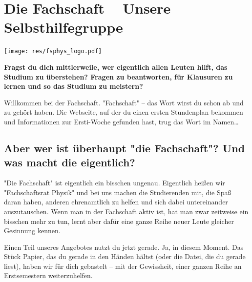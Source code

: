 \section[Die Fachschaft]{Die Fachschaft -- Unsere Selbsthilfegruppe}
\label{fsphys:sec}
\begin{center}
	\vspace{-0.5cm}
	\texttt{[image: res/fsphys\_logo.pdf]}
	\vspace{-0.5cm}
\end{center}
\begin{multicols}{2}
\fibelspacingsubsubsection[subsection]

\textbf{Fragst du dich mittlerweile, wer eigentlich allen Leuten hilft, das Studium zu überstehen? Fragen zu beantworten, für Klausuren zu lernen und so das Studium zu meistern?}

Willkommen bei der Fachschaft.
"Fachschaft" -- das Wort wirst du schon ab und zu gehört haben.
Die Webseite, auf der du einen ersten Stundenplan bekommen und Informationen zur Ersti-Woche gefunden hast, trug das Wort im Namen\dots

\subsection*{Aber wer ist überhaupt "die Fachschaft"? Und was macht die eigentlich?}
"Die Fachschaft" ist eigentlich ein bisschen ungenau.
Eigentlich heißen wir "Fachschaftsrat Physik" und bei uns machen die Studierenden mit, die Spaß daran haben, anderen ehrenamtlich zu helfen und sich dabei untereinander auszutauschen.
Wenn man in der Fachschaft aktiv ist, hat man zwar zeitweise ein bisschen mehr zu tun, lernt aber dafür eine ganze Reihe neuer Leute gleicher Gesinnung kennen.

Einen Teil unseres Angebotes nutzt du jetzt gerade.
Ja, in diesem Moment.
Das Stück Papier, das du gerade in den Händen hältst (oder die Datei, die du gerade liest), haben wir für dich gebastelt -- mit der Gewissheit, einer ganzen Reihe an Erstsemestern weiterzuhelfen.


\end{multicols}
